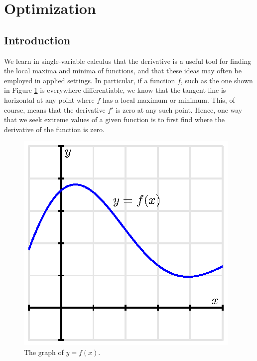 \section{Optimization} \label{S:10.7.Optimization}

\vspace*{-14 pt}

\subsection*{Introduction}

We learn in single-variable calculus that the derivative is a useful tool for finding the local maxima
  and minima of functions, and that these ideas may often be employed in applied settings.  In particular, if a function $f$,
  such as the one shown in Figure \ref{F:10.7.preview.1} is everywhere
  differentiable, we know that the tangent line is horizontal at any point
  where $f$ has a local maximum or minimum.  This, of course, means that the derivative $f'$ is zero at any such point.  Hence, one way that we seek extreme values of a given function is to first find where the derivative of the function is zero.

    \begin{figure}[ht]
      \begin{center}
        \includegraphics{figures/fig_10_7_preview_1.eps}
      \end{center}	
      \caption{The graph of $y=f(x)$.}
      \label{F:10.7.preview.1}
    \end{figure}

